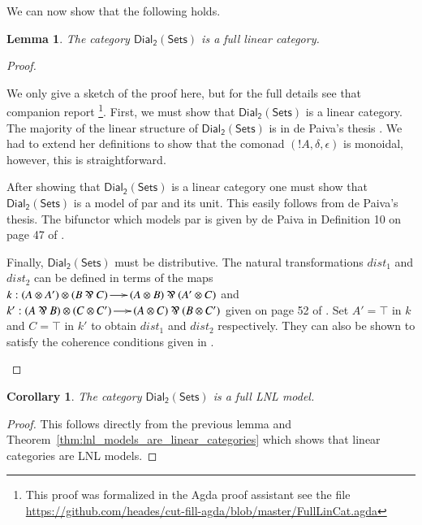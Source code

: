 \documentclass{elsarticle}
\newcommand{\dial}[0]{\mathsf{Dial_2}(\mathsf{Sets})}
\newtheorem{lemma}[theorem]{Lemma}
\newtheorem{corollary}[theorem]{Corollary}
\begin{document}
We can now show that the following holds.
\begin{lemma}
  \label{lemma:ddial_is_a_linear_category}
  The category $\dial$ is a full linear category.
\end{lemma}
\begin{proof}
  \begin{paper}
    We only give a sketch of the proof here, but for the full details
    see that companion report \cite{Eades:2015}\footnote{This proof
      was formalized in the Agda proof assistant see the file
      \url{https://github.com/heades/cut-fill-agda/blob/master/FullLinCat.agda}}. First,
    we must show that $\dial$ is a linear category.  The majority of
    the linear structure of $\dial$ is in de Paiva's thesis
    \cite{dePaiva:1988}.  We had to extend her definitions to show
    that the comonad $(!A,\delta,\epsilon)$ is monoidal, however, this
    is straightforward.

    After showing that $\dial$ is a linear category one must show that
    $\dial$ is a model of par and its unit.  This easily follows from
    de Paiva's thesis.  The bifunctor which models par is given by de
    Paiva in Definition 10 on page 47 of \cite{dePaiva:1988}.

    Finally, $\dial$ must be distributive.  The natural
    transformations $dist_1$ and $dist_2$ can be defined in terms of
    the maps $k : (A \otimes A') \otimes (B \parr C) \to (A \otimes B)
    \parr (A' \otimes C)$ and $k' : (A \parr B) \otimes (C \otimes C')
    \to (A \otimes C) \parr (B \otimes C')$ given on page 52 of
    \cite{dePaiva:1988}.  Set $A' = \top$ in $k$ and $C = \top$ in
    $k'$ to obtain $dist_1$ and $dist_2$ respectively.  They can also
    be shown to satisfy the coherence conditions given in
    \cite{Cockett:1997}.
  \end{paper}
  
\end{proof}

\begin{corollary}
  \label{corollary:dial-FLNL}
  The category $\dial$ is a full LNL model.
\end{corollary}
\begin{proof}
  This follows directly from the previous lemma and
  Theorem~\ref{thm:lnl_models_are_linear_categories} which shows that
  linear categories are LNL models.
\end{proof}
\end{document}
